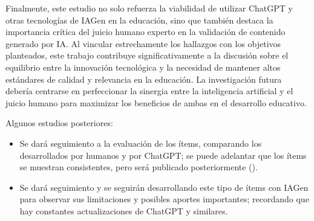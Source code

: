 Finalmente, este estudio no solo refuerza la viabilidad de utilizar
ChatGPT y otras tecnologías de IAGen en la educación, sino que también
destaca la importancia crítica del juicio humano experto en la
validación de contenido generado por IA. Al vincular estrechamente los
hallazgos con los objetivos planteados, este trabajo contribuye
significativamente a la discusión sobre el equilibrio entre la
innovación tecnológica y la necesidad de mantener altos estándares de
calidad y relevancia en la educación. La investigación futura debería
centrarse en perfeccionar la sinergia entre la inteligencia artificial y
el juicio humano para maximizar los beneficios de ambas en el desarrollo
educativo.

Algunos estudios posteriores:

\begin{itemize}
\item Se dará seguimiento a la evaluación de los ítems, comparando los desarrollados por humanos y por ChatGPT; se puede adelantar que los ítems se muestran consistentes, pero será publicado posteriormente ().
\item Se dará seguimiento y se seguirán desarrollando este tipo de ítems con IAGen para observar sus limitaciones y posibles aportes importantes; recordando que hay constantes actualizaciones de ChatGPT y similares.
\end{itemize}